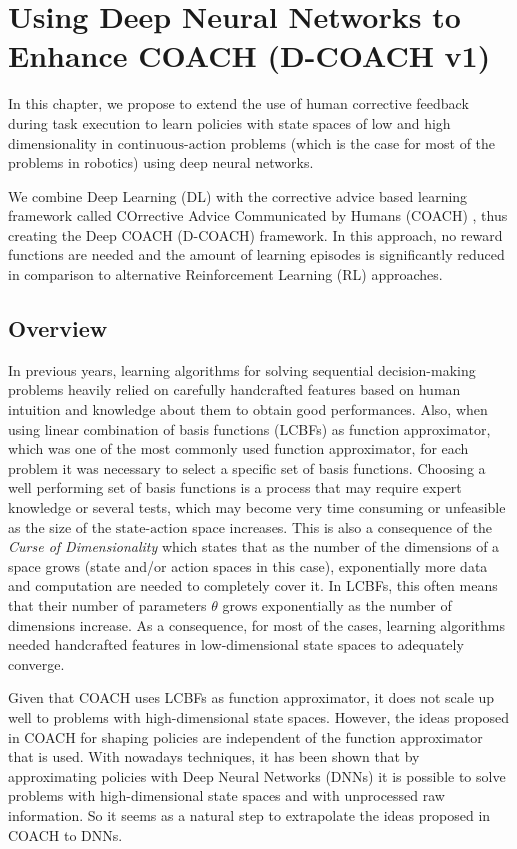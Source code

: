 \chapter{Using Deep Neural Networks to Enhance COACH (D-COACH v1)}
In this chapter, we propose to extend the use of human corrective feedback during task execution to learn policies with state spaces of low and high dimensionality in $\text{continuous-action}$ problems (which is the case for most of the problems in robotics) using deep neural networks.

 We combine Deep Learning (DL) with the corrective advice based learning framework called COrrective Advice Communicated by Humans (COACH) \cite{Celemin2018AnInteractive}, thus creating the Deep COACH (D-COACH) framework. In this approach, no reward functions are needed and the amount of learning episodes is significantly reduced in comparison to alternative Reinforcement Learning (RL) approaches.

\section{Overview}
In previous years, learning algorithms for solving sequential decision-making problems heavily relied on carefully handcrafted features based on human intuition and knowledge about them to obtain good performances. Also, when using linear combination of basis functions (LCBFs) as function approximator, which was one of the most commonly used function approximator, for each problem it was necessary to select a specific set of basis functions. Choosing a well performing set of basis functions is a process that may require expert knowledge or several tests, which may become very time consuming or unfeasible as the size of the $\text{state-action}$ space increases. This is also a consequence of the \emph{Curse of Dimensionality} \cite{Bellman1957} which states that as the number of the dimensions of a space grows (state and/or action spaces in this case), exponentially more data and computation are needed to completely cover it. In LCBFs, this often means that their number of parameters $\theta$ grows exponentially as the number of dimensions increase. As a consequence, for most of the cases, learning algorithms needed handcrafted features in low-dimensional state spaces to adequately converge.

Given that COACH uses LCBFs as function approximator, it does not scale up well to problems with high-dimensional state spaces. However, the ideas proposed in COACH for shaping policies are independent of the function approximator that is used. With nowadays techniques, it has been shown that by approximating policies with Deep Neural Networks (DNNs) it is possible to solve problems with high-dimensional state spaces and with unprocessed raw information. So it seems as a natural step to extrapolate the ideas proposed in COACH to DNNs. 

